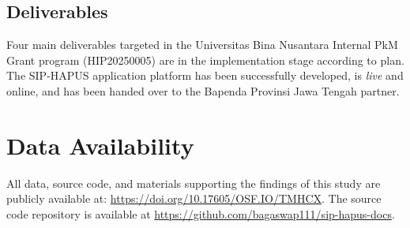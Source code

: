 \documentclass[conference,a4paper]{IEEEtran}
\begin{document}
\subsection{Deliverables}
\label{subsec:deliverables}

Four main deliverables targeted in the Universitas Bina Nusantara Internal PkM Grant program (HIP20250005) are in the implementation stage according to plan. The SIP-HAPUS application platform has been successfully developed, is \emph{live} and online, and has been handed over to the Bapenda Provinsi Jawa Tengah partner.

\section{Data Availability}
\label{sec:data-availability}

All data, source code, and materials supporting the findings of this study are publicly available at: \url{https://doi.org/10.17605/OSF.IO/TMHCX}. The source code repository is available at \url{https://github.com/bagaswap111/sip-hapus-docs}.









\end{document}
